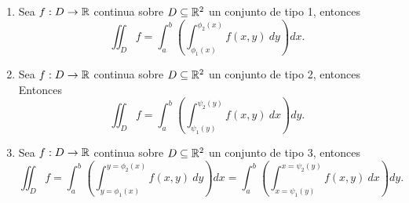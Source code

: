 \begin{propertie} \label{col:fubini}
   
    \begin{enumerate}
        \item  Sea $f:D\to\mathbb{R}$ continua sobre  $D\subseteq\mathbb{R}^2$  un conjunto de tipo 1, entonces
        \[
            \iint_D f=\int_a^b\left(\int_{\phi_1(x)}^{\phi_2(x)}f(x,y)\:dy\right)dx.  
        \]
        \item  Sea $f:D\to\mathbb{R}$ continua sobre  $D\subseteq\mathbb{R}^2$  un conjunto de tipo 2, entonces
        Entonces
        \[
            \iint_D f=\int_a^b\left(\int_{\psi_1(y)}^{\psi_2(y)}f(x,y)\:dx\right)dy.  
        \]
        \item  Sea $f:D\to\mathbb{R}$ continua sobre  $D\subseteq\mathbb{R}^2$  un conjunto de tipo 3, entonces
        \[
            \iint_D f=\int_a^b\left(\int_{y=\phi_1(x)}^{y=\phi_2(x)}f(x,y)\:dy\right)dx=\int_a^b\left(\int_{x=\psi_1(y)}^{x=\psi_2(y)}f(x,y)\:dx\right)dy. 
        \]
    \end{enumerate}
\end{propertie}
